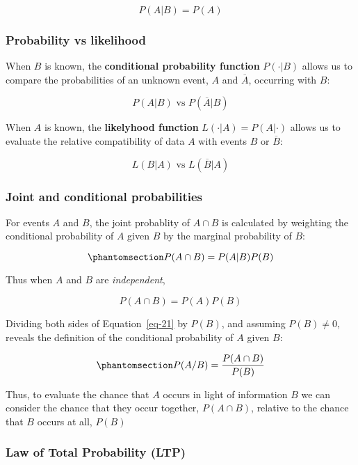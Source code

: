 \documentclass[
  letterpaper,
  DIV=11,
  numbers=noendperiod]{scrartcl}
\theoremstyle{definition}
\theoremstyle{remark}
\begin{document}
\[
P(A|B) = P(A)
\]

\subsubsection{Probability vs
likelihood}\label{probability-vs-likelihood}

When \(B\) is known, the \textbf{conditional probability function}
\(P(\cdot|B)\) allows us to compare the probabilities of an unknown
event, \(A\) and \(\overline{A}\), occurring with \(B\):

\[
P(A|B) \text{ vs } P(\overline{A}|B)
\]

When \(A\) is known, the \textbf{likelyhood function}
\(L(\cdot|A) = P(A|\cdot)\) allows us to evaluate the relative
compatibility of data \(A\) with events \(B\) or \(\overline{B}\):

\[
L(B|A) \text{ vs } L(\overline{B}|A)
\]

\subsubsection{Joint and conditional
probabilities}\label{joint-and-conditional-probabilities}

For events \(A\) and \(B\), the joint probablity of \(A \cap B\) is
calculated by weighting the conditional probability of \(A\) given \(B\)
by the marginal probability of \(B\):

\begin{equation}\phantomsection\label{eq-21}{
P(A \cap B) = P(A|B)P(B)
}\end{equation}

Thus when \(A\) and \(B\) are \emph{independent},

\[
P(A\cap B) = P(A)P(B)
\]

Dividing both sides of Equation~\ref{eq-21} by \(P(B)\), and assuming
\(P(B) \neq 0\), reveals the definition of the conditional probability
of \(A\) given \(B\):

\begin{equation}\phantomsection\label{eq-22}{
P(A/B) = \frac{P(A \cap B)}{P(B)}
}\end{equation}

Thus, to evaluate the chance that \(A\) occurs in light of information
\(B\) we can consider the chance that they occur together,
\(P(A \cap B)\), relative to the chance that \(B\) occurs at all,
\(P(B)\)

\subsubsection{Law of Total Probability
(LTP)}\label{law-of-total-probability-ltp}
\end{document}
